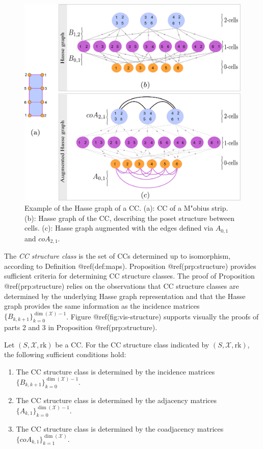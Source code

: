 \documentclass[
  12pt,
]{krantz}
\providecommand{\tightlist}{%
  \setlength{\itemsep}{0pt}\setlength{\parskip}{0pt}}
\begin{document}
\begin{figure}

{\centering \includegraphics{figures/poset} 

}

\caption{Example of the Hasse graph of a CC. (a): CC of a M"{o}bius strip. (b): Hasse graph of the CC, describing the poset structure between cells. (c): Hasse graph augmented with the edges defined via $A_{0,1}$ and $coA_{2,1}$.}\label{fig:hasse-diagram}
\end{figure}

The \emph{CC structure class} is the set of CCs determined up to
isomorphism, according to Definition @ref(def:maps). Proposition
@ref(prp:structure) provides sufficient criteria for determining CC
structure classes. The proof of Proposition @ref(prp:structure) relies
on the observations that CC structure classes are determined by the
underlying Hasse graph representation and that the Hasse graph provides
the same information as the incidence matrices
\(\{B_{k,k+1}\}_{k=0}^{\dim(\mathcal{X})-1}\). Figure
@ref(fig:vis-structure) supports visually the proofs of parts 2 and 3 in
Proposition @ref(prp:structure).

\label{structure}
Let \((S, \mathcal{X},\mbox{rk})\) be a CC. For the CC structure class
indicated by \((S, \mathcal{X},\mbox{rk})\), the following sufficient
conditions hold:

\begin{enumerate}
\def\labelenumi{\arabic{enumi}.}
\tightlist
\item
  The CC structure class is determined by the incidence matrices
  \(\{B_{k,k+1}\}_{k=0}^{ \dim(\mathcal{X}) -1}\).
\item
  The CC structure class is determined by the adjacency matrices
  \(\{A_{k,1}\}_{k=0}^{\dim(\mathcal{X})-1}\).
\item
  The CC structure class is determined by the coadjacency matrices
  \(\{coA_{k,1}\}_{k=1}^{\dim(\mathcal{X})}\).
\end{enumerate}
\end{document}
